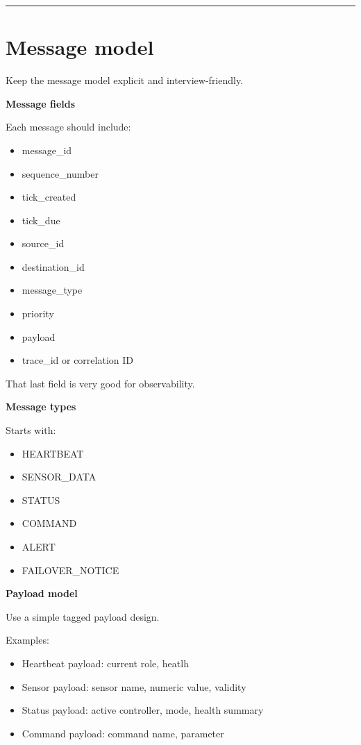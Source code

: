 \documentclass{report}
\begin{document}
\begin{center}
\rule{0.9\textwidth}{1pt}
\end{center}
\section{Message model}

\vspace{\baselineskip} Keep the message model explicit and interview-friendly. 

\noindent\textbf{Message fields}


\noindent Each message should include:
\begin{itemize}
   \item message\_id
   \item sequence\_number
   \item tick\_created
   \item tick\_due
   \item source\_id
   \item destination\_id
   \item message\_type
   \item priority
   \item payload
   \item trace\_id or correlation ID
\end{itemize}
\vspace{\baselineskip} That last field is very good for observability. 

\textbf{Message types}

Starts with:
\begin{itemize}
   \item HEARTBEAT
   \item SENSOR\_DATA
   \item STATUS
   \item COMMAND
   \item ALERT
   \item FAILOVER\_NOTICE
\end{itemize}

\textbf{Payload model}

Use a simple tagged payload design. 

Examples:
\begin{itemize}
   \item Heartbeat payload: current role, heatlh
   \item Sensor payload: sensor name, numeric value, validity
   \item Status payload: active controller, mode, health summary
   \item Command payload: command name, parameter
\end{itemize}
\end{document}
